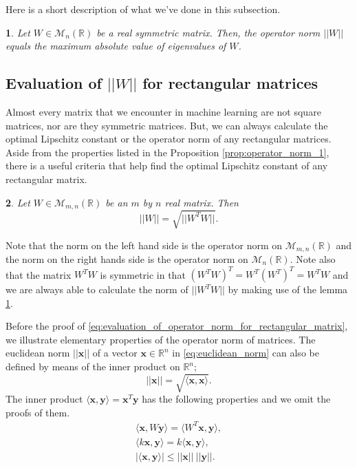 \documentclass[12pt]{report}
\numberwithin{figure}{chapter}
\theoremstyle{plain}
\newtheorem{theorem}{\protect\theoremname}[chapter]
\theoremstyle{definition}
\theoremstyle{corollary}
\theoremstyle{definition}
\theoremstyle{plain}
\theoremstyle{definition}
\theoremstyle{plain}
\newtheorem{lemma}[theorem]{\protect\lemmaname}
\providecommand{\lemmaname}{Lemma}
\providecommand{\theoremname}{Theorem}
\newcommand\bx{\ensuremath{\boldsymbol x}}
\newcommand\by{\ensuremath{\boldsymbol y}}
\begin{document}
Here is a short description of what we've done in this subsection.
\begin{lemma}\label{lemm:evaluation_of_operator_norm_for_square_matrix}
Let \(W\in\mathcal M_n(\mathbb R)\) be a real symmetric matrix.
Then, the operator norm \(||W||\) equals the maximum absolute value of eigenvalues of \(W\).
\end{lemma}

%
\subsection{Evaluation of \(||W||\) for rectangular matrices}
Almost every matrix that we encounter in machine learning are not square matrices, nor are they symmetric matrices.
But, we can always calculate the optimal Lipschitz constant or the operator norm of any rectangular matrices.
Aside from the properties listed in the Proposition \ref{prop:operator_norm_1}, there is a useful criteria that help find the optimal Lipschitz constant of any rectangular matrix.

\begin{theorem}\label{theo:evaluation_of_operator_norm_for_rectangular_matrix}
Let \(W\in\mathcal M_{m,n}(\mathbb R)\) be an \(m\) by \(n\) real matrix.
Then
\begin{equation}\label{eq:evaluation_of_operator_norm_for_rectangular_matrix}
||W||=\sqrt{||W^TW||}.
\end{equation}
\end{theorem}

Note that the norm on the left hand side is the operator norm on \(\mathcal M_{m,n}(\mathbb R)\) and the norm on the right hands side is the operator norm on \(\mathcal M_n(\mathbb R)\).
Note also that the matrix \(W^TW\) is symmetric in that \((W^TW)^T=W^T(W^T)^T=W^TW\) and we are always able to calculate the norm of \(||W^TW||\) by making use of the lemma \ref{lemm:evaluation_of_operator_norm_for_square_matrix}.

Before the proof of \eqref{eq:evaluation_of_operator_norm_for_rectangular_matrix}, we illustrate elementary properties of the operator norm of matrices.
The euclidean norm \(||\bx||\) of a vector \(\bx\in\mathbb R^n\) in \eqref{eq:euclidean_norm} can also be defined by means of the inner product on \(\mathbb R^n\);
\begin{equation}\label{eq:euclidean norm_2}
||\bx||=\sqrt{\langle \bx,\bx\rangle}.
\end{equation}
The inner product \(\langle \bx,\by\rangle=\bx^T\by\) has the following properties and we omit the proofs of them.
\begin{gather*}
\langle \bx,W\by\rangle=\langle W^T\bx,\by\rangle,\\
\langle k\bx,\by\rangle=k\langle \bx,\by\rangle,\\
|\langle\bx,\by\rangle|\le||\bx||\:||\by||.
\end{gather*}
\end{document}
